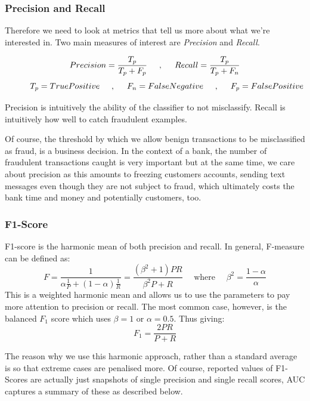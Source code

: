 \documentclass[12pt,a4paper,twoside]{report}
\begin{document}
\subsubsection{Precision and Recall}

Therefore we need to look at metrics that tell us more about what we're interested in. Two main measures of interest are \textit{Precision} and \textit{Recall}.

\[
    {Precision} = \frac{T_p}{T_p+F_p} \hspace{5mm} , \hspace{5mm} {Recall} = \frac{T_p}{T_p+F_n} 
\]
\[
	\hspace{1cm}  {T_p} = {True Positive} \hspace{5mm},\hspace{5mm} {F_n} = {False Negative}\hspace{5mm},\hspace{5mm} {F_p} = {False Positive}
\]

Precision is intuitively the ability of the classifier to not misclassify. Recall is intuitively how well to catch fraudulent examples. 

Of course, the threshold by which we allow benign transactions to be misclassified as fraud, is a business decision. In the context of a bank, the number of fraudulent transactions caught is very important but at the same time, we care about precision as this amounts to freezing customers accounts, sending text messages even though they are not subject to fraud, which ultimately costs the bank time and money and potentially customers, too.

\subsubsection{F1-Score}

F1-score is the harmonic mean of both precision and recall. In general, F-measure can be defined as:
$$F = \frac { 1} { \alpha \frac { 1} { P } + ( 1- \alpha ) \frac { 1} { R } } = \frac { \left( \beta ^ { 2} + 1\right) P R } { \beta ^ { 2} P + R } \quad \text{ where } \quad \beta ^ { 2} = \frac { 1- \alpha } { \alpha }$$
This is a weighted harmonic mean and allows us to use the parameters to pay more attention to precision or recall. The most common case, however, is the balanced $F_1$ score which uses $\beta = 1$ or $\alpha=0.5.$
Thus giving:
$$F _ { 1} = \frac { 2P R } { P + R }$$

The reason why we use this harmonic approach, rather than a standard average is so that extreme cases are penalised more. Of course, reported values of F1-Scores are actually just snapshots of single precision and single recall scores, AUC captures a summary of these as described below. 
\end{document}
